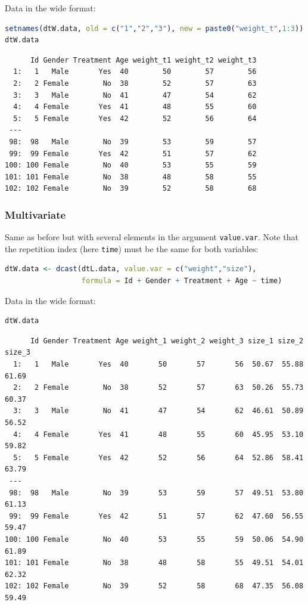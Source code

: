 \documentclass{article}
\begin{document}
Data in the wide format:
\begin{lstlisting}[language=r,numbers=none]
setnames(dtW.data, old = c("1","2","3"), new = paste0("weight_t",1:3))
dtW.data
\end{lstlisting}

\label{}
\begin{verbatim}
      Id Gender Treatment Age weight_t1 weight_t2 weight_t3
  1:   1   Male       Yes  40        50        57        56
  2:   2 Female        No  38        52        57        63
  3:   3   Male        No  41        47        54        62
  4:   4 Female       Yes  41        48        55        60
  5:   5 Female       Yes  42        52        56        64
 ---                                                       
 98:  98   Male        No  39        53        59        57
 99:  99 Female       Yes  42        51        57        62
100: 100 Female        No  40        53        55        59
101: 101 Female        No  38        48        58        55
102: 102 Female        No  39        52        58        68
\end{verbatim}

\clearpage
\subsubsection{Multivariate}
\label{sec:orgb39ae5c}


Same as before but with several elements in the argument
\texttt{value.var}. Note that the repetition index (here \texttt{time}) must be the
same for both variables:
\begin{lstlisting}[language=r,numbers=none]
dtW.data <- dcast(dtL.data, value.var = c("weight","size"),
                  formula = Id + Gender + Treatment + Age ~ time)
\end{lstlisting}

Data in the wide format:
\begin{lstlisting}[language=r,numbers=none]
dtW.data
\end{lstlisting}

\label{}
\begin{verbatim}
      Id Gender Treatment Age weight_1 weight_2 weight_3 size_1 size_2 size_3
  1:   1   Male       Yes  40       50       57       56  50.67  55.88  61.69
  2:   2 Female        No  38       52       57       63  50.26  55.73  60.37
  3:   3   Male        No  41       47       54       62  46.61  50.89  56.52
  4:   4 Female       Yes  41       48       55       60  45.95  53.10  59.82
  5:   5 Female       Yes  42       52       56       64  52.86  58.41  63.79
 ---                                                                         
 98:  98   Male        No  39       53       59       57  49.51  53.80  61.13
 99:  99 Female       Yes  42       51       57       62  47.60  56.55  59.47
100: 100 Female        No  40       53       55       59  50.06  54.90  61.89
101: 101 Female        No  38       48       58       55  49.51  54.01  62.32
102: 102 Female        No  39       52       58       68  47.35  56.08  59.49
\end{verbatim}
\end{document}
